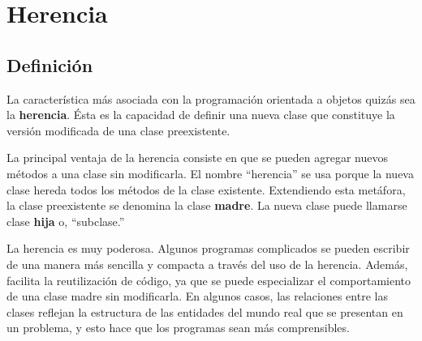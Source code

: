 


\chapter{Herencia}

\section{Definición}

La característica más asociada con la programación orientada a objetos
quizás sea la {\bf herencia}.  Ésta es la capacidad de definir una
nueva clase que constituye la versión modificada de una clase 
preexistente.

La principal ventaja de la herencia consiste en que se pueden agregar 
nuevos métodos a una clase sin modificarla. El nombre
``herencia'' se usa porque la nueva clase hereda todos los métodos
de la clase existente. Extendiendo esta metáfora, la clase preexistente
se denomina la clase  {\bf madre}. La nueva clase puede
llamarse clase {\bf hija} o, ``subclase.''


La herencia es muy poderosa. Algunos programas complicados se pueden
escribir de una manera más sencilla y compacta a través del uso de la
herencia. Además, facilita la reutilización de código, ya que 
se puede especializar el comportamiento de una clase madre sin modificarla.
En algunos casos, las relaciones entre las clases reflejan la estructura
de las entidades del mundo real que se presentan en un problema, y esto
hace que los programas sean más comprensibles.

